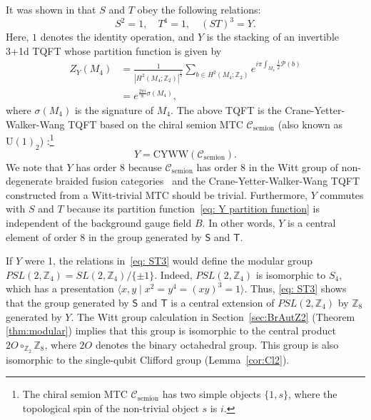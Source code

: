 \documentclass[aps,twocolumn,prx,floatfix,preprintnumbers, nofootinbib,10pt]{revtex4-2}
\numberwithin{equation}{section}
\theoremstyle{definition}
\theoremstyle{remark}
\theoremstyle{claim}
\newcommand{\Z}{{\mathbb Z}}
\begin{document}
\vspace*{\baselineskip}
It was shown in \cite{Gaiotto:2014kfa, BhardwajLeeTachikawa2020, Choi:2022zal} that $S$ and $T$ obey the following relations:
\begin{equation}
S^2=1, \quad T^4=1, \quad (ST)^3=Y.
\label{eq: ST3}
\end{equation}
Here, $1$ denotes the identity operation, and $Y$ is the stacking of an invertible 3+1d TQFT whose partition function is given by
\begin{equation}
\begin{aligned}
Z_Y(M_4) &= \frac{1}{|H^2(M_4; \mathbb{Z}_2)|^{\frac{1}{2}}} \sum_{b \in H^2(M_4; \mathbb{Z}_2)} e^{i \pi \int_{M_4} \frac{1}{2} \mathcal{P}(b)} \\
&= e^{\frac{2\pi i}{8} \sigma(M_4)},
\end{aligned}
\label{eq: Y partition function}
\end{equation}
where $\sigma(M_4)$ is the signature of $M_4$.
The above TQFT is the Crane-Yetter-Walker-Wang TQFT based on the chiral semion MTC $\mathcal{C}_{\mathrm{semion}}$ (also known as $\mathrm{U}(1)_2$) \cite{Crane:1993if, Crane:1994ji, walker20123+}:\footnote{The chiral semion MTC $\mathcal{C}_{\mathrm{semion}}$ has two simple objects $\{1, s\}$, where the topological spin of the non-trivial object $s$ is $i$.}
\begin{equation}
Y = \mathrm{CYWW}(\mathcal{C}_{\mathrm{semion}}).
\end{equation}
We note that $Y$ has order 8 because $\mathcal{C}_{\mathrm{semion}}$ has order 8 in the Witt group of non-degenerate braided fusion categories~\cite{davydov2013witt} and the Crane-Yetter-Walker-Wang TQFT constructed from a Witt-trivial MTC should be trivial.
Furthermore, $Y$ commutes with $S$ and $T$ because its partition function~\eqref{eq: Y partition function} is independent of the background gauge field $B$.
{In other words, $Y$ is a central element of order 8 in the group generated by $\mathsf{S}$ and $\mathsf{T}$.}


{If $Y$ were 1, the relations in~\eqref{eq: ST3} would define the modular group $PSL(2, \mathbb{Z}_4) = SL(2, \mathbb{Z}_4)/{\{\pm 1\}}$.
Indeed, $PSL(2, \mathbb{Z}_4)$ is isomorphic to $S_4$, which has a presentation $\langle x, y \mid x^2=y^4=(xy)^3=1 \rangle$.
Thus, \eqref{eq: ST3} shows that the group generated by $\mathsf{S}$ and $\mathsf{T}$ is a central extension of $PSL(2, \mathbb{Z}_4)$ by $\mathbb{Z}_8$ generated by $Y$.
The Witt group calculation in Section~\ref{sec:BrAutZ2} (Theorem \ref{thm:modular}) implies that this group is isomorphic to the central product $2O\circ_{\Z_2}\Z_8$, where $2O$ denotes the binary octahedral group. This group is also isomorphic to the single-qubit Clifford group (Lemma~\ref{cor:Cl2}).
}
\end{document}
